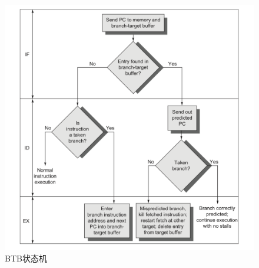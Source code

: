 \documentclass{ctexart}
\begin{document}
\begin{figure}[H]
    \centering
    \includegraphics[scale=0.45]{ztj.png}
    \caption{BTB状态机}
\end{figure}
\end{document}

